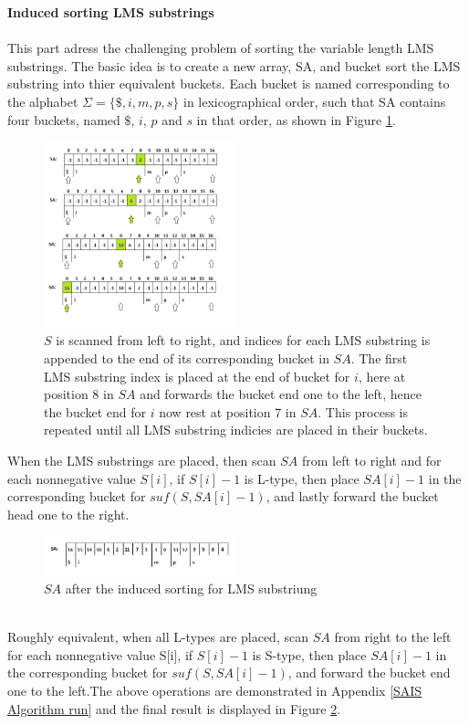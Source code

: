 \documentclass[12pt]{article} %
\begin{document}
\textbf{Induced sorting LMS substrings}
\\ \\
This part adress the challenging problem of sorting the variable length LMS substrings. The basic idea is to create a new array, SA, and bucket sort the LMS substring into thier equivalent buckets. Each bucket is named corresponding to the alphabet $\Sigma=\{\$,i,m,p,s\}$ in lexicographical order, such that SA contains four buckets, named $\$$, $i$, $p$ and $s$ in that order, as shown in Figure \ref{fig:SAIS_LMS}.

\begin{figure}[H]
    \centering
    \includegraphics[width=0.5\textwidth]{SAIS_LMS}
    \captionsetup{width=0.8\textwidth}
    \caption{$S$ is scanned from left to right, and indices for each LMS substring is appended to the end of its corresponding bucket in $SA$. The first LMS substring index is placed at the end of bucket for $i$, here at position 8 in $SA$ and forwards the bucket end one to the left, hence the bucket end for $i$ now rest at position 7 in $SA$. This process is repeated until all LMS substring indicies are placed in their buckets.}
    \label{fig:SAIS_LMS}
\end{figure}

When the LMS substrings are placed, then scan $SA$ from left to right and for each nonnegative value $S[i]$, if $S[i]-1$ is L-type, then place $SA[i]-1$ in the corresponding bucket for $suf(S, SA[i]-1)$, and lastly forward the bucket head one to the right. 
\begin{figure}[H]
    \centering
    \includegraphics[width=0.5\textwidth]{SAIS_LMSfinal}
    \captionsetup{width=0.8\textwidth}
    \caption{$SA$ after the induced sorting for LMS substriung}
    \label{fig:SAIS_LMSfinal}
    
\end{figure}
\\
Roughly equivalent, when all L-types are placed, scan $SA$ from right to the left for each nonnegative value S[i], if $S[i]-1$ is S-type, then place $SA[i]-1$ in the corresponding bucket for $suf(S, SA[i]-1)$, and forward the bucket end one to the left.The above operations are demonstrated in Appendix \ref{SAIS Algorithm run} and the final result is displayed in Figure \ref{fig:SAIS_LMSfinal}.
\end{document}
